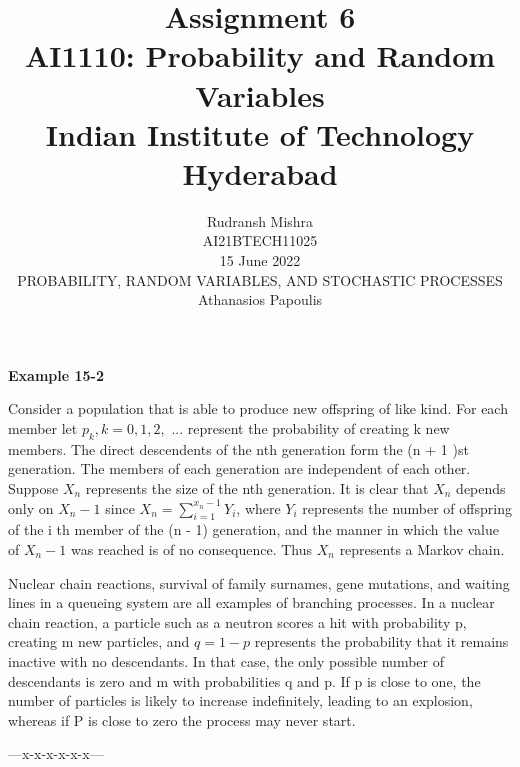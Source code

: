 \documentclass[journal,12pt,twocolumn]{IEEEtran}
\title{Assignment 6 \\ \Large AI1110: Probability and Random Variables \\ \large Indian Institute of Technology Hyderabad}
\author{Rudransh Mishra \\ \normalsize AI21BTECH11025 \\ \vspace*{20pt} \normalsize  15 June 2022 \\ \vspace*{20pt} PROBABILITY, RANDOM VARIABLES, AND STOCHASTIC PROCESSES\\ \normalsize Athanasios Papoulis}
\begin{document}
\maketitle

\textbf{Example 15-2}

Consider a population that is able to produce new offspring of like kind. For each member let $p_k, k = 0, 1, 2,$ ... represent the probability of creating k new members. The direct descendents of the nth generation form the (n + 1 )st generation. The members of each generation are independent of each other. Suppose $X_n$ represents the size of the nth generation. It is clear that $X_n$ depends only on $X_n-1$ since $X_n = \sum_{i=1}^{x_n-1}Y_i$, where $Y_i$ represents the number of offspring of the i th member of the (n - 1) generation, and the manner in which the value of $X_n-1$ was reached is of no consequence. Thus $X_n$ represents a Markov chain.

Nuclear chain reactions, survival of family surnames, gene mutations, and waiting lines in a queueing system are all examples of branching processes. In a nuclear chain reaction, a particle such as a neutron scores a hit with probability p, creating m new particles, and $q = 1-p$ represents the probability that it remains inactive with no descendants. In that case, the only possible number of descendants is zero and m with probabilities q and p. If p is close to one, the number of particles is likely to increase indefinitely, leading to an explosion, whereas if P is close to zero the process may never start.

\begin{center} ---x-x-x-x-x-x--- \end{center}
\end{document}
